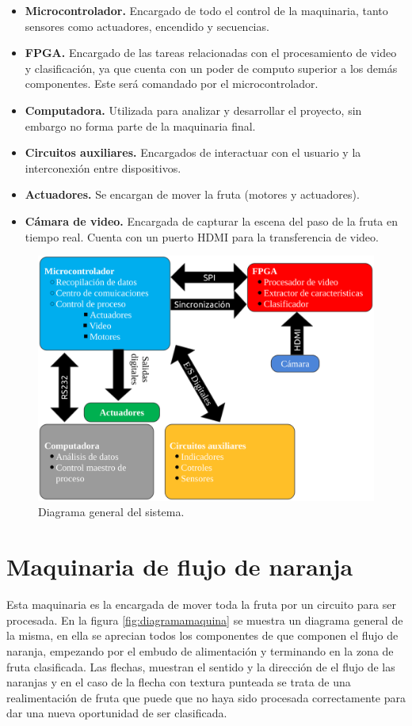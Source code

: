 \documentclass[twoside,spanish,ESP,MSc]{plantillaLabUPV}
\theoremstyle{definition}
\begin{document}
\begin{itemize}
	\item \textbf{Microcontrolador.} Encargado de todo el control de la maquinaria, tanto sensores como actuadores, encendido y secuencias. 
	\item \textbf{FPGA.} Encargado de las tareas relacionadas con el procesamiento de video y clasificación, ya que cuenta con un poder de computo superior a los demás componentes. Este será comandado por el microcontrolador.
	\item \textbf{Computadora.} Utilizada para analizar y desarrollar el proyecto, sin embargo no forma parte de la maquinaria final.
	\item \textbf{Circuitos auxiliares.} Encargados de interactuar con el usuario y la interconexión entre dispositivos.
	\item \textbf{Actuadores.} Se encargan de mover la fruta (motores y actuadores).
	\item \textbf{Cámara de video.} Encargada de capturar la escena del paso de la fruta en tiempo real. Cuenta con un puerto HDMI para la transferencia de video.
\end{itemize}


\begin{figure}[h]
	\centering
	\includegraphics*[scale=0.5]{sis} 
	\caption{Diagrama general del sistema.}
	\label{sis}
\end{figure}


\section{Maquinaria de flujo de naranja}
Esta maquinaria es la encargada de mover toda la fruta por un circuito para ser procesada. En la figura \ref{fig:diagramamaquina} se muestra un diagrama general de la misma, en ella se aprecian todos los componentes de que componen el flujo de naranja, empezando por el embudo de alimentación y terminando en la zona de fruta clasificada. Las flechas, muestran el sentido y la dirección de el flujo de las naranjas y en el caso de la flecha con textura punteada se trata de una realimentación de fruta que puede que no haya sido procesada correctamente para dar una nueva oportunidad de ser clasificada.  
\end{document}
